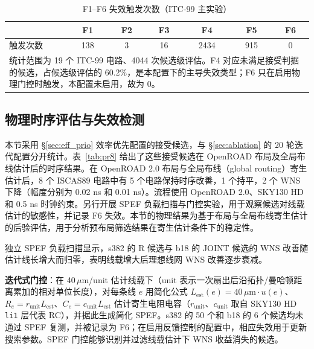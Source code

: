 \documentclass[twocolumn,10pt,fontset=windows]{ctexart}
\begin{document}
\begin{table}[!htb]
\centering
\caption{F1--F6 失效触发次数（ITC-99 主实验）}
\label{tab:f16_dist}
\scriptsize
\setlength{\tabcolsep}{3pt}
\begin{tabular}{lcccccc}
\toprule
 & \textbf{F1} & \textbf{F2} & \textbf{F3} & \textbf{F4} & \textbf{F5} & \textbf{F6} \\
\midrule
触发次数 & 138 & 3 & 16 & 2434 & 915 & 0 \\
\bottomrule
\multicolumn{7}{p{0.95\columnwidth}}{\footnotesize 统计范围为 19 个 ITC-99 电路、4044 次候选级评估。F4 对应未满足接受判据的候选，占候选级评估的 60.2\%，是本配置下的主导失效类型；F6 只在启用物理门控时触发，本配置未启用，故为 0。} \\
\end{tabular}
\end{table}

\subsection{物理时序评估与失效检测}\label{sec:phys_closure}

本节采用 \S\ref{sec:eff_prio} 效率优先配置的接受候选，与 \S\ref{sec:ablation} 的 20 轮迭代配置分开统计。表~\ref{tab:pr8} 给出了这些接受候选在 OpenROAD 布局及全局布线估计后的时序结果。在 OpenROAD 2.0 布局与全局布线（global routing）寄生估计后，8 个 ISCAS89 电路中有 5 个电路保持时序改善，1 个持平，2 个 WNS 下降（幅度分别为 0.02 ns 和 0.01 ns）。流程使用 OpenROAD 2.0、SKY130 HD 和 0.5 ns 时钟约束。另行开展 SPEF 负载扫描与门控实验，用于观察候选对线载估计的敏感性，并记录 F6 失效。本节的物理结果为基于布局与全局布线寄生估计的后验评估，用于分析预布局筛选结果在寄生估计条件下的稳定性。


独立 SPEF 负载扫描显示，s382 的 R 候选与 b18 的 JOINT 候选的 WNS 改善随估计线长增大而归零，表明线载增大后理想线网 WNS 改善逐步衰减。

\textbf{迭代式门控}：在 40\,$\mu$m/unit 估计线载下（unit 表示一次扇出后沿拓扑/曼哈顿距离累加的相对单位长度），对每条线 $e$ 用简化公式 $L_{\mathrm{est}}(e)=40\,\mu\mathrm{m} \cdot u(e)$、$R_e=r_{\mathrm{unit}}L_{\mathrm{est}}$、$C_e=c_{\mathrm{unit}}L_{\mathrm{est}}$ 估计寄生电阻电容（$r_{\mathrm{unit}}$、$c_{\mathrm{unit}}$ 取自 SKY130 HD \texttt{li1} 层代表 RC），并据此生成简化 SPEF。s382 的 50 个和 b18 的 6 个候选均未通过 SPEF 复测，并被记录为 F6；在启用反馈控制的配置中，相应失效用于更新搜索参数。SPEF 门控能够识别并过滤线载估计下 WNS 收益消失的候选。
\end{document}
